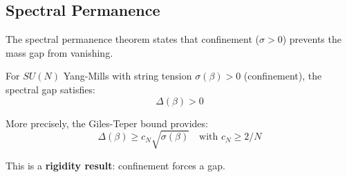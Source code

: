 \subsection{Spectral Permanence}
\label{subsec:spectral-permanence}

The spectral permanence theorem states that confinement ($\sigma > 0$) prevents 
the mass gap from vanishing.

\begin{theorem}
\label{thm:spectral-permanence-app79}
For $SU(N)$ Yang-Mills with string tension $\sigma(\beta) > 0$ (confinement), 
the spectral gap satisfies:
\[
\Delta(\beta) > 0
\]

More precisely, the Giles-Teper bound provides:
\[
\Delta(\beta) \geq c_N \sqrt{\sigma(\beta)} \quad \text{with } c_N \geq 2/N
\]

This is a \textbf{rigidity result}: confinement forces a gap.
\end{theorem}


